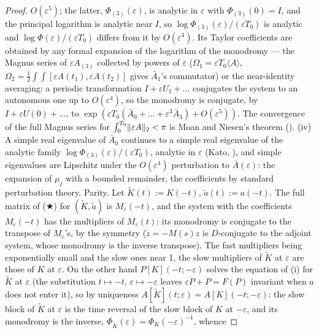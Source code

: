 \begin{proof}
$O(\varepsilon^5)$; the latter, $\Phi_{(3)}(\varepsilon)$, is analytic in $\varepsilon$ with $\Phi_{(3)}(0) = I$, and
the principal logarithm is analytic near $I$, so $\log\Phi_{(3)}(\varepsilon)/(\varepsilon T_0)$ is analytic and
$\log\Phi(\varepsilon)/(\varepsilon T_0)$ differs from it by $O(\varepsilon^4)$. Its Taylor coefficients are
obtained by any formal expansion of the logarithm of the monodromy --- the Magnus series of $\varepsilon A_{(3)}$
collected by powers of $\varepsilon$ ($\Omega_1 = \varepsilon T_0\langle A\rangle$,
$\Omega_2 = \frac12\int\int[\varepsilon A(t_1),\varepsilon A(t_2)]$ gives $\bar A_1$'s commutator) or the
near-identity averaging: a periodic transformation $I + \varepsilon U_1 + \dots$ conjugates the system to an
autonomous one up to $O(\varepsilon^4)$, so the monodromy is conjugate, by $I + \varepsilon U(0) + \dots$, to
$\exp(\varepsilon T_0(\bar A_0 + \dots + \varepsilon^3\bar A_3) + O(\varepsilon^5))$. The convergence of the full
Magnus series for $\int_0^{T_0}\lVert \varepsilon A\rVert_2 < \pi$ is Moan and Niesen's theorem (\cite{S59}). (iv) A simple
real eigenvalue of $\bar A_0$ continues to a simple real eigenvalue of the analytic family
$\log\Phi_{(3)}(\varepsilon)/(\varepsilon T_0)$, analytic in $\varepsilon$ (Kato, \cite{S59}), and simple eigenvalues
are Lipschitz under the $O(\varepsilon^4)$ perturbation to $\bar A(\varepsilon)$: the expansion of $\mu_j$ with a
bounded remainder, the coefficients by standard perturbation theory. Parity. Let $\tilde K(t) := K(-t)$,
$\tilde a(t) := a(-t)$. The full matrix of \textup{($\bigstar$)} for $(\tilde K,\tilde a)$ is $M_\varepsilon(-t)$, and
the system with the coefficients $M_\varepsilon(-t)$ has the multipliers of $M_\varepsilon(t)$: its monodromy is
conjugate to the transpose of $M_\varepsilon$'s, by the symmetry ($\dot z = -M(s)z$ is $D$-conjugate to the adjoint
system, whose monodromy is the inverse transpose). The fast multipliers being exponentially small and the slow ones
near 1, the slow multipliers of $\tilde K$ at $\varepsilon$ are those of $K$ at $\varepsilon$. On the other hand
$P[K](-t;-\varepsilon)$ solves the equation of (i) for $\tilde K$ at $\varepsilon$ (the substitution $t\mapsto-t$,
$\varepsilon\mapsto-\varepsilon$ leaves $\varepsilon\dot P + P = F(P)$ invariant when $a$ does not enter it), so by
uniqueness $A[\tilde K](t;\varepsilon) = A[K](-t;-\varepsilon)$: the slow block of $\tilde K$ at $\varepsilon$ is the
time reversal of the slow block of $K$ at $-\varepsilon$, and its monodromy is the inverse,
$\Phi_{\tilde K}(\varepsilon) = \Phi_K(-\varepsilon)^{-1}$, whence

\end{proof}
